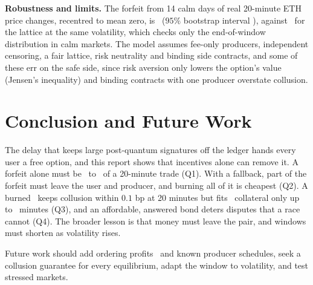 \documentclass[11pt]{article}
\begin{document}
\textbf{Robustness and limits.} The forfeit from 14 calm days of real 20-minute ETH price changes, recentred to mean zero, is \TwFstar\ ($95\%$ bootstrap interval \TwCI), against \TwLognormal\ for the lattice at the same volatility, which checks only the end-of-window distribution in calm markets. The model assumes fee-only producers, independent censoring, a fair lattice, risk neutrality and binding side contracts, and some of these err on the safe side, since risk aversion only lowers the option's value (Jensen's inequality) and binding contracts with one producer overstate collusion.

\section{Conclusion and Future Work}\label{sec:disc}
The delay that keeps large post-quantum signatures off the ledger hands every user a free option, and this report shows that incentives alone can remove it. A forfeit alone must be \FstarLow\ to \FstarHigh\ of a 20-minute trade (Q1). With a fallback, part of the forfeit must leave the user and producer, and burning all of it is cheapest (Q2). A burned \CpHundred\ keeps collusion within $0.1$ bp at 20 minutes but fits \KappaAssumed\ collateral only up to \FrontierMin\ minutes (Q3), and an affordable, answered bond deters disputes that a race cannot (Q4). The broader lesson is that money must leave the pair, and windows must shorten as volatility rises.

Future work should add ordering profits~\cite{daian2020flashboys} and known producer schedules, seek a collusion guarantee for every equilibrium, adapt the window to volatility, and test stressed markets.
\end{document}
